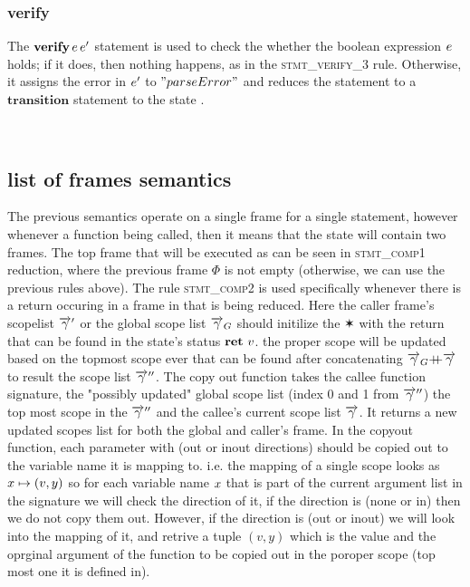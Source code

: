 \documentclass[UTF8]{article}
\begin{document}
\begin{figure}[ht!]
    \ottusedrule{\ottdrulestmtXXtrans{}} 
\end{figure}



\subsubsection*{verify}
The $\mathbf{verify} \, e \, e'$ statement is used to check the whether the boolean expression $e$ holds; if it does, then nothing happens, as in the \textsc{stmt\_verify\_3} rule. Otherwise, it assigns the error in $e'$ to $"parseError"$ and reduces the statement to a $\mathbf{transition}$ statement to the state \reject{}.
 
\begin{figure}[ht!]
    \ottusedrule{\ottdrulestmtXXverifyXXThree{}} \\
    \ottusedrule{\ottdrulestmtXXverifyXXFour{}} 
\end{figure}



\subsection{list of frames semantics}
The previous semantics operate on a single frame for a single statement, however whenever a function being called, then it means that the state will contain two frames. The top frame that will be executed as can be seen in \textsc{stmt\_comp1} reduction, where the previous frame $\Phi$ is not empty (otherwise, we can use the previous rules above). 
The rule \textsc{stmt\_comp2} is used specifically whenever there is a return occuring in a frame in that is being reduced. Here the caller frame's scopelist $\overrightarrow{\gamma}'$ or the global scope list $\overrightarrow{\gamma}_G$ should initilize the $\varstar$ with the return that can be found in the state's status $\textbf{ret}\,\, v$. the proper scope will be updated based on the topmost scope ever that can be found after concatenating $\overrightarrow{\gamma}_G {+}\mspace{-8mu}{+} \overrightarrow{\gamma}$ to result the scope list $\overrightarrow{\gamma}''$.
The copy out function takes the callee function signature, the "possibly updated" global scope list (index 0 and 1 from $\overrightarrow{\gamma}''$) the top most scope in the $\overrightarrow{\gamma}''$ and the callee's current scope list $\overrightarrow{\gamma}$. It returns a new updated scopes list for both the global and caller's frame. 
In the copyout function, each parameter with (out or inout directions) should be copied out to the variable name it is mapping to. i.e. the mapping of a single scope looks as  $ x \mapsto (v , y) $ so for each variable name $x$ that is part of the current argument list in the signature we will check the direction of it, if the direction is (none or in) then we do not copy them out. However, if the direction is (out or inout) we will look into the mapping of it, and retrive a tuple $(v,y)$ which is the value and the oprginal argument of the function to be copied out in the poroper scope (top most one it is defined in).
\end{document}
